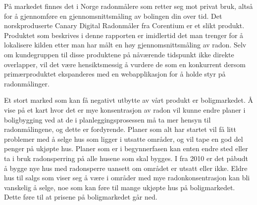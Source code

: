 På markedet finnes det i Norge radonmålere som retter seg mot privat bruk, altså for å gjennomføre en gjennomsnittsmåling av bolingen din over tid. Det norskproduserte Canary Digital Radonmåler fra Corentium er et slikt produkt. Produktet som beskrives i denne rapporten er imidlertid det man trenger for å lokalisere kilden etter man har målt en høy gjennomsnittsmåling av radon. Selv om kundegruppen til disse produktene på nåværende tidspunkt ikke direkte overlapper, vil det være hensiktsmessig å vurdere de som en konkurrent dersom primærproduktet ekspanderes med en webapplikasjon for å holde styr på radonmålinger.

Et stort marked som kan få negativt utbytte av vårt produkt er boligmarkedet. Å vise på et kart hvor det er mye konsentrasjon av radon vil kunne endre planer i boligbygging ved at de i planleggingsprosessen må ta mer hensyn til radonmålingene, og dette er fordyrende. Planer som alt har startet vil få litt problemer med å selge hus som ligger i utsatte områder, og vil tape en god del penger på ukjøpte hus. Planer som er i begynnerfasen kan enten endre sted eller ta i bruk radonsperring på alle husene som skal bygges. I fra 2010 er det påbudt å bygge nye hus med radonsperre uansett om området er utsatt eller ikke. Eldre hus til salgs som viser seg å være i områder med mye radonkonsentrasjon kan bli vanskelig å selge, noe som kan føre til mange ukjøpte hus på boligmarkedet. Dette føre til at prisene på boligmarkedet går ned.
